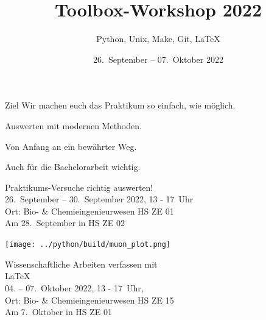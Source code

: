

\title[Toolbox 2022]{Toolbox-Workshop 2022}
\subtitle{Python, Unix, Make, Git, \LaTeX{}}
\date{26.~September – 07.~Oktober 2022}
\author[Toolbox-Team]{}



\maketitle

\begin{frame}{Ziel}
  \setlength\parskip{3ex}
  \huge
  Wir machen euch das Praktikum so einfach, wie möglich.

  Auswerten mit modernen Methoden.

  Von Anfang an ein bewährter Weg.

  Auch für die Bachelorarbeit wichtig.
\end{frame}

\begin{frame}
  \vspace{0.7cm}
  \begin{center}
    \huge Praktikums-Versuche richtig auswerten!\\
    26.~September – 30.~September 2022, 13 - 17~Uhr\\%
    Ort: Bio- \& Chemieingenieurwesen HS ZE 01\\
    \textcolor{red!70!black}{Am 28.~September in HS ZE 02}
  \end{center}
\end{frame}

\begin{frame}[plain]
  \texttt{[image: ../python/build/muon\_plot.png]}
\end{frame}

\begin{frame}
  \begin{center}
    \huge Wissenschaftliche Arbeiten verfassen mit \\[0.5\baselineskip]
    \textrm{\fontsize{80}{120}\selectfont\LaTeX{}}\\[0.5\baselineskip]
    04. – 07.~Oktober 2022, 13 - 17~Uhr,\\
    Ort: Bio- \& Chemieingenieurwesen HS ZE 15\\
    \textcolor{red!70!black}{Am 7.~Oktober in HS ZE 01}
  \end{center}
\end{frame}

